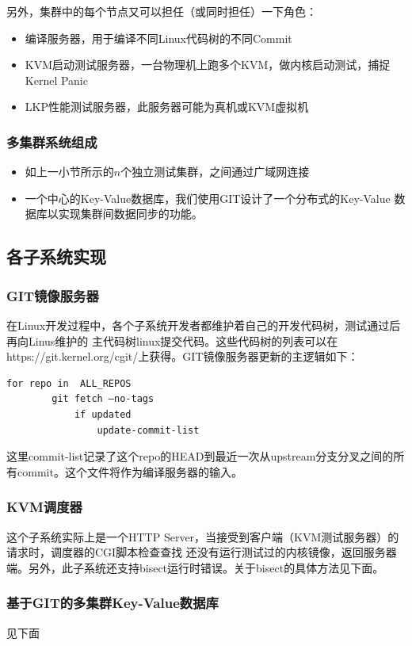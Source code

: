 \documentclass[a4paper]{article}
\begin{document}
	另外，集群中的每个节点又可以担任（或同时担任）一下角色：
	\begin{itemize}
	\item 编译服务器，用于编译不同Linux代码树的不同Commit
	\item KVM启动测试服务器，一台物理机上跑多个KVM，做内核启动测试，捕捉Kernel Panic
	\item LKP性能测试服务器，此服务器可能为真机或KVM虚拟机
	\end{itemize}

	\subsubsection{多集群系统组成}
	\begin{itemize}
		\item 如上一小节所示的$n$个独立测试集群，之间通过广域网连接
		\item 一个中心的Key-Value数据库，我们使用GIT设计了一个分布式的Key-Value
			数据库以实现集群间数据同步的功能。
	\end{itemize}

\subsection{各子系统实现}
\subsubsection{GIT镜像服务器}
	在Linux开发过程中，各个子系统开发者都维护着自己的开发代码树，测试通过后再向Linus维护的
	主代码树linux提交代码。这些代码树的列表可以在https://git.kernel.org/cgit/上获得。GIT镜像服务器更新的主逻辑如下：
	\begin{Verbatim}[frame=single]
	for repo in  ALL_REPOS
		git fetch –no-tags
			if updated
				update-commit-list
	\end{Verbatim}
	这里commit-list记录了这个repo的HEAD到最近一次从upstream分支分叉之间的所有commit。这个文件将作为编译服务器的输入。

\subsubsection{KVM调度器}
	这个子系统实际上是一个HTTP Server，当接受到客户端（KVM测试服务器）的请求时，调度器的CGI脚本检查查找
	还没有运行测试过的内核镜像，返回服务器端。另外，此子系统还支持bisect运行时错误。关于bisect的具体方法见下面。

\subsubsection{基于GIT的多集群Key-Value数据库}  
见下面
\end{document}
